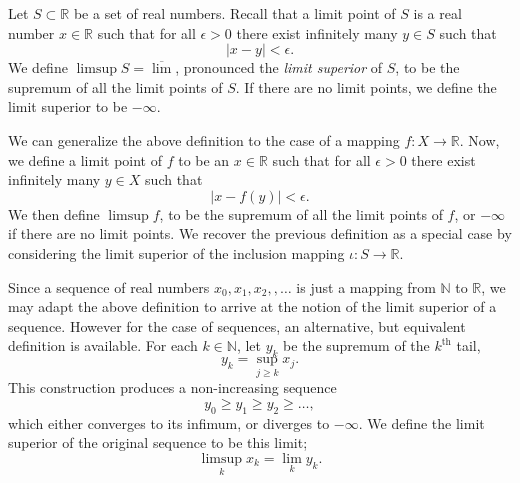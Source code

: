 \documentclass[12pt]{article}
\newcommand{\reals}{\mathbb{R}}
\newcommand{\natnums}{\mathbb{N}}
\newcommand{\supth}{^{\text{th}}}
\begin{document}
Let $S\subset\reals$ be a set of real numbers.  Recall that a limit
point of $S$ is a real number $x\in\reals$ such that for all
$\epsilon>0$ there exist infinitely many $y\in S$ such that
$$\vert x-y\vert <\epsilon.$$
We define $\limsup S=\overline{\lim}$, pronounced the
{\em limit superior} of $S$, to be the supremum of all the limit
points of $S$.  If there are no limit points, we define the limit
superior to be $-\infty$.  

We can generalize the above definition to the case of a 
 mapping $f:X\to\reals$. Now, we define a limit point of 
 $f$ to be an $x\in \reals$ such that for all
$\epsilon>0$ there exist infinitely many $y\in X$ such that
$$\vert x-f(y)\vert <\epsilon.$$
We then define $\limsup f$, to be the
supremum of all the limit points of $f$, or $-\infty$ if there are no
limit points.  We recover the previous definition as a special case by
considering the limit superior of the inclusion mapping $\iota: S\to
\reals$.


Since a sequence of real numbers $x_0, x_1, x_2, ,\ldots$ is just a
mapping from $\natnums$ to $\reals$, we may adapt the above definition
to arrive at the notion of the limit superior of a sequence.  However
for the case of sequences, an alternative, but equivalent definition
is available.  For each $k\in\natnums$, let $y_k$ be the supremum of
the $k\supth$ tail,
$$y_k = \sup_{j\geq k} x_j .$$
This construction produces a
non-increasing sequence
$$y_0 \geq y_1 \geq y_2 \geq \ldots,$$
which either converges to its infimum, or diverges to $-\infty$.
We define the limit superior of the original sequence to be this limit;
$$\limsup_{k} x_k = \lim_k y_k.$$
\end{document}
